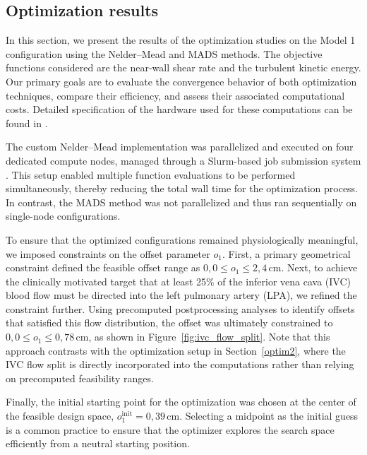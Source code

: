 \newpage
\subsection{Optimization results}  
In this section, we present the results of the optimization studies on the Model 1 configuration using the Nelder--Mead and MADS methods. The objective functions considered are the near-wall shear rate and the turbulent kinetic energy. Our primary goals are to evaluate the convergence behavior of both optimization techniques, compare their efficiency, and assess their associated computational costs. Detailed specification of the hardware used for these computations can be found in \cite{gpu}.

The custom Nelder--Mead implementation was parallelized and executed on four dedicated compute nodes, managed through a Slurm-based job submission system \cite{slurm}. This setup enabled multiple function evaluations to be performed simultaneously, thereby reducing the total wall time for the optimization process. In contrast, the MADS method was not parallelized and thus ran sequentially on single-node configurations.

To ensure that the optimized configurations remained physiologically meaningful, we imposed constraints on the offset parameter \(o_1\). First, a primary geometrical constraint defined the feasible offset range as \(0{,}0 \leq o_1 \leq 2{,}4\,\text{cm}\). Next, to achieve the clinically motivated target that at least 25\% of the inferior vena cava (IVC) blood flow must be directed into the left pulmonary artery (LPA), we refined the constraint further. Using precomputed postprocessing analyses to identify offsets that satisfied this flow distribution, the offset was ultimately constrained to \(0{,}0 \leq o_1 \leq 0{,}78\,\text{cm}\), as shown in Figure~\ref{fig:ivc_flow_split}. Note that this approach contrasts with the optimization setup in Section~\ref{optim2}, where the IVC flow split is directly incorporated into the computations rather than relying on precomputed feasibility ranges.

Finally, the initial starting point for the optimization was chosen at the center of the feasible design space, \(o_1^\text{init} = 0{,}39\,\text{cm}\). Selecting a midpoint as the initial guess is a common practice to ensure that the optimizer explores the search space efficiently from a neutral starting position.

